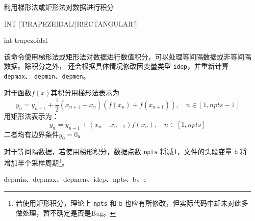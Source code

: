 \label{cmd:int}

利用梯形法或矩形法对数据进行积分

\begin{SACSTX}
INT [T!RAPEZEIDAL!|R!ECTANGULAR!]
\end{SACSTX}

\begin{SACDFT}
int trapezoidal
\end{SACDFT}

该命令使用梯形法或矩形法对数据进行数值积分，可以处理等间隔数据或非等间隔数据。除积分之外，
还会根据具体情况修改因变量类型 \texttt{idep}，并重新计算 \texttt{depmax}、
\texttt{depmin}、\texttt{depmen}。

对于函数$f(x)$其积分用梯形法表示为
\[
    y_n = y_{n-1} + \frac{1}{2}(x_{n+1}-x_n) (f(x_n)+f(x_{n+1})), \quad n\in[1,npts-1]
\]
用矩形法表示为：
\[
    y_n = y_{n-1} + (x_n-x_{n-1})f(x_n), \quad n\in[1,npts]
\]
二者均有边界条件$y_0=0$。

对于等间隔数据，若使用梯形积分，数据点数 \texttt{npts} 将减1，文件的头段变量
\texttt{b} 将增加半个采样周期\footnote{若使用矩形积分，理论上 \texttt{npts} 和
\texttt{b} 也应有所修改，但实际代码中却未对此多做处理，暂不确定是否是Bug。}。

depmin、depmax、depmen、idep、npts、b、e
